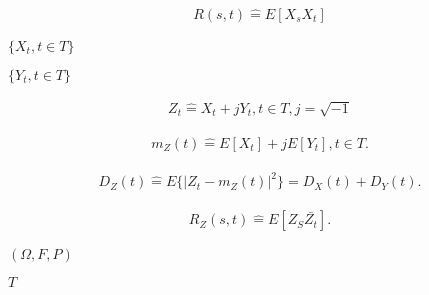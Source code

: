 \begin{preview}
\setcounter{equation}{0}%
\begin{align}
  R(s, t) \hat{=} E[X_sX_t]
\end{align}

\end{preview}

\begin{preview}
\setcounter{equation}{0}%
\(\{X_t, t \in T\}\)
\end{preview}

\begin{preview}
\setcounter{equation}{0}%
\(\{Y_t, t \in T\}\)
\end{preview}

\begin{preview}
\setcounter{equation}{0}%
\begin{align}
  Z_t \hat{=} X_t + jY_t, t \in T, j = \sqrt{-1}
\end{align}

\end{preview}

\begin{preview}
\setcounter{equation}{0}%
\begin{align}
m_Z(t) \hat{=}E[X_t] + jE[Y_t], t \in T.
\end{align}

\end{preview}

\begin{preview}
\setcounter{equation}{0}%
\begin{align}
  D_Z(t) \hat{=} E\{\vert Z_t - m_Z(t)\vert^2\} = D_X(t) + D_Y(t).
\end{align}

\end{preview}

\begin{preview}
\setcounter{equation}{0}%
\begin{align}
  R_Z(s, t) \hat= E[Z_S \bar{Z_t}].
\end{align}

\end{preview}

\begin{preview}
\setcounter{equation}{0}%
\((\Omega, F, P)\)
\end{preview}

\begin{preview}
\setcounter{equation}{0}%
\(T\)
\end{preview}

